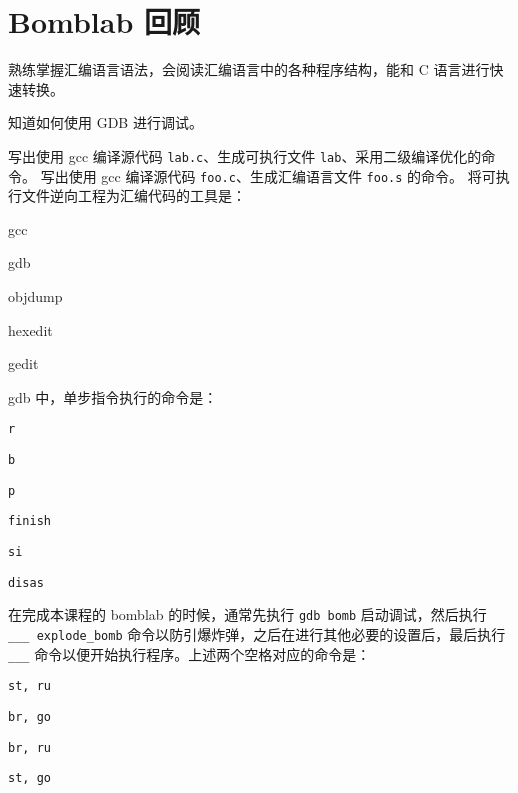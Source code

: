 \chapter{Bomblab 回顾}
    \begin{summary}
        \begin{compactitem}
            \item 熟练掌握汇编语言语法，会阅读汇编语言中的各种程序结构，能和 C 语言进行快速转换。
            \item 知道如何使用 GDB 进行调试。
        \end{compactitem}
    \end{summary}

    \begin{problems}
        \pro 写出使用 gcc 编译源代码 \verb|lab.c|、生成可执行文件 \verb|lab|、采用二级编译优化的命令。
        \pro 写出使用 gcc 编译源代码 \verb|foo.c|、生成汇编语言文件 \verb|foo.s| 的命令。
        \pro 将可执行文件逆向工程为汇编代码的工具是：
        \begin{choices}
            \item gcc
            \item gdb
            \item objdump
            \item hexedit
            \item gedit
        \end{choices}
        \pro gdb 中，单步指令执行的命令是：
        \begin{choices}
            \item \verb|r|
            \item \verb|b|
            \item \verb|p|
            \item \verb|finish|
            \item \verb|si|
            \item \verb|disas|
        \end{choices}
         在完成本课程的 bomblab 的时候，通常先执行 \verb|gdb bomb| 启动调试，然后执行 \verb|___ explode_bomb| 命令以防引爆炸弹，之后在进行其他必要的设置后，最后执行 \verb|___| 命令以便开始执行程序。上述两个空格对应的命令是：
        \begin{choices}
            \item \verb|st, ru|
            \item \verb|br, go|
            \item \verb|br, ru|
            \item \verb|st, go|
        \end{choices}
    \end{problems}